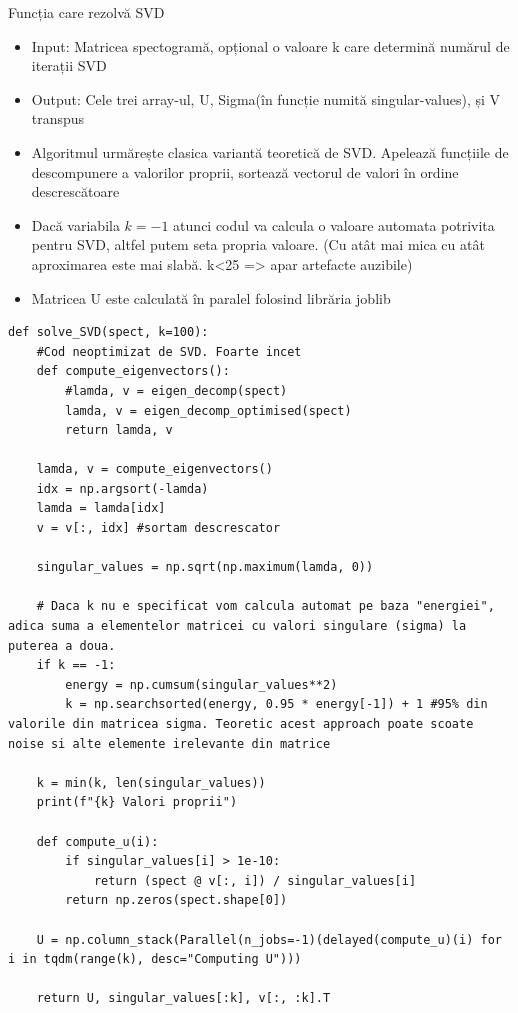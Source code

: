 \documentclass[12pt]{article}
\begin{document}
Funcția care rezolvă SVD
\begin{itemize}
    \item Input: Matricea spectogramă, opțional o valoare k care determină numărul de iterații SVD
    \item Output: Cele trei array-ul, U, Sigma(în funcție numită singular-values), și V transpus
    \item Algoritmul urmărește clasica variantă teoretică de SVD. Apelează funcțiile de descompunere a valorilor proprii, sortează vectorul de valori în ordine descrescătoare
    \item Dacă variabila $k = -1$ atunci codul va calcula o valoare automata potrivita pentru SVD, altfel putem seta propria valoare. (Cu atât mai mica cu atât aproximarea este mai slabă. k<25 => apar artefacte auzibile)
    \item Matricea U este calculată în paralel folosind librăria joblib
\end{itemize}

\begin{lstlisting}
def solve_SVD(spect, k=100):
    #Cod neoptimizat de SVD. Foarte incet
    def compute_eigenvectors():
        #lamda, v = eigen_decomp(spect)
        lamda, v = eigen_decomp_optimised(spect)
        return lamda, v
    
    lamda, v = compute_eigenvectors()
    idx = np.argsort(-lamda)
    lamda = lamda[idx]
    v = v[:, idx] #sortam descrescator

    singular_values = np.sqrt(np.maximum(lamda, 0))
    
    # Daca k nu e specificat vom calcula automat pe baza "energiei", adica suma a elementelor matricei cu valori singulare (sigma) la puterea a doua.
    if k == -1:
        energy = np.cumsum(singular_values**2)
        k = np.searchsorted(energy, 0.95 * energy[-1]) + 1 #95% din valorile din matricea sigma. Teoretic acest approach poate scoate noise si alte elemente irelevante din matrice
    
    k = min(k, len(singular_values))
    print(f"{k} Valori proprii")
    
    def compute_u(i):
        if singular_values[i] > 1e-10:
            return (spect @ v[:, i]) / singular_values[i]
        return np.zeros(spect.shape[0])
    
    U = np.column_stack(Parallel(n_jobs=-1)(delayed(compute_u)(i) for i in tqdm(range(k), desc="Computing U")))
    
    return U, singular_values[:k], v[:, :k].T
\end{lstlisting}
\end{document}
